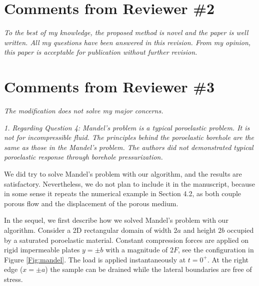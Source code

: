 \documentclass{elsarticle}
\newcommand{\review}[1]{ \textit{#1}}
\begin{document}
\section*{Comments from Reviewer \#2}

\review{To the best of my knowledge, the proposed method is novel and the paper is well written. All my questions have been answered in this revision. From my opinion, this paper is acceptable for publication without further revision.}
\bigskip

%

\section*{Comments from Reviewer \#3}
    \review{The modification does not solve my major concerns.}
\bigskip

	\review{1. Regarding Question 4: Mandel's problem is a typical poroelastic problem. It is not for incompressible fluid. The principles behind the poroelastic borehole are the same as those in the Mandel's problem. The authors did not demonstrated typical poroelastic response through borehole pressurization.}
	\bigskip
	
	
We did try to solve Mandel's problem with our algorithm, and the results are satisfactory. Nevertheless, we do not plan to include it in the manuscript, because in some sense it repeats the numerical example in Section 4.2, as both couple porous flow and the displacement of the porous medium.
	
	In the sequel, we first describe how we solved Mandel's problem with our algorithm.
	Consider a 2D rectangular domain of width $2a$ and height $2b$ occupied by a saturated poroelastic material. Constant compression forces are applied on rigid impermeable plates $y=\pm b$ with a magnitude of $2F$, see the configuration in Figure \ref{Fig:mandel}. The load is applied instantaneously at $t=0^+$. At the right edge ($x = \pm a$) the sample can be drained while the lateral boundaries are free of stress.
	
\end{document}
